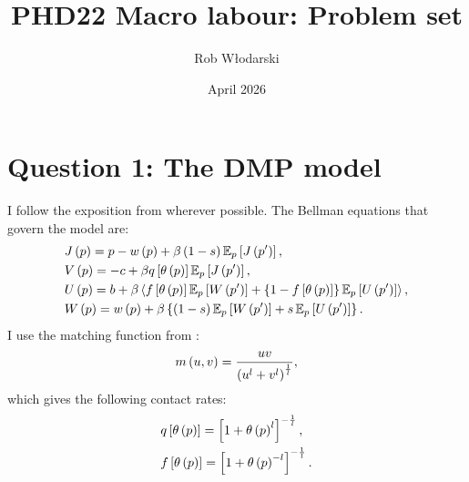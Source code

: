 \documentclass[11pt,leqno]{article}
\begin{document}
\title{\Large \bfseries \vspace{-5mm} PHD22 Macro labour: Problem set \vspace{-5mm}}
\author{Rob Włodarski}
\date{April 2026}
\maketitle

\section*{Question 1: The DMP model}
I follow the exposition from \citet{hagedorn_cyclical_2008} wherever possible.
The Bellman equations that govern the model are:
\begin{subequations}
    \begin{align}
        & J\bp{p} = p - w\bp{p} + \beta \bp{1-s}  \E_p \bs{J\bp{p'}}, \\
        & V\bp{p} = -c + \beta q \bs{\theta\bp{p}}  \E_p \bs{J\bp{p'}}, \\ 
        & U\bp{p} = b + \beta \ba{f \bs{\theta\bp{p}} \E_p \bs{W\bp{p'}}  + \bc{1 - f \bs{\theta\bp{p}}}  \E_p \bs{U\bp{p'}}}, \\
        & W\bp{p} = w\bp{p} + \beta \bc{\bp{1-s} \E_p \bs{W\bp{p'}} + s \E_p \bs{U \bp{p'}} }.
    \end{align}
\end{subequations} 
I use the matching function from \citet{den_haan_job_2000} :
\begin{equation}
    m\left( u,v \right)= \frac{uv}{\left( u^l + v^l \right)^{\frac{1}{l}}},
\end{equation} 
which gives the following contact rates:
\begin{subequations}
    \begin{align}
        & q\left[ \theta\left( p \right) \right] = \left[ 1+\theta\left( p \right)^{l} \right]^{-\frac{1}{l}}, \label{jfr}\\
        & f\left[ \theta\left( p \right) \right] = \left[ 1+\theta\left( p \right)^{-l} \right]^{-\frac{1}{l}}. \label{jobfindingrate}
    \end{align}
\end{subequations}
\end{document}
